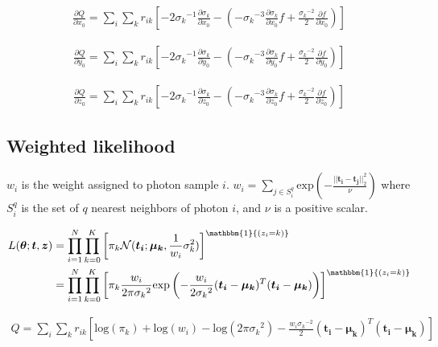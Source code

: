 \documentclass{article}
\begin{document}
\begin{align} \label{eqn:dx_no_weight}
\frac{\partial Q}{\partial x_0} = \sum_i \sum_k r_{ik} \left[ -2{\sigma_k}^{-1}\frac{\partial \sigma_k}{\partial x_0} - \left( -{\sigma_k}^{-3} \frac{\partial \sigma_k}{\partial x_0}f + \frac{{\sigma_k}^{-2}}{2} \frac{\partial f}{\partial x_0}  \right) \right] 
\end{align}

\begin{align} \label{eqn:dy_no_weight}
\frac{\partial Q}{\partial y_0} = \sum_i \sum_k r_{ik} \left[ -2{\sigma_k}^{-1}\frac{\partial \sigma_k}{\partial y_0} - \left( -{\sigma_k}^{-3} \frac{\partial \sigma_k}{\partial y_0}f + \frac{{\sigma_k}^{-2}}{2} \frac{\partial f}{\partial y_0}  \right) \right] 
\end{align}

\begin{align} \label{eqn:dz_no_weight}
\frac{\partial Q}{\partial z_0} = \sum_i \sum_k r_{ik} \left[ -2{\sigma_k}^{-1}\frac{\partial \sigma_k}{\partial z_0} - \left( -{\sigma_k}^{-3} \frac{\partial \sigma_k}{\partial z_0}f + \frac{{\sigma_k}^{-2}}{2} \frac{\partial f}{\partial z_0}  \right) \right] 
\end{align}


\subsection{Weighted likelihood} \label{sec:weighted_like}

$w_i$ is the weight assigned to photon sample $i$.
$w_i = \sum\limits_{j \in S_i^q} \text{exp} \left( -\frac{||\bm{t_i}-\bm{t_j}||_2^2}{\nu} \right)$
where $S_i^q$ is the set of $q$ nearest neighbors of photon $i$, and $\nu$ is a 
positive scalar.

\begin{align}
L(\bm{\theta};\bm{t},\bm{z}) &= \prod_{i=1}^N \prod_{k=0}^K \left[ \pi_k \mathcal{N}(\bm{t_i};\bm{\mu_k},\frac{1}{w_i}\sigma_k^2) \right]^{\mathbbm{1}{(z_i=k)}} \\
&= \prod_{i=1}^N \prod_{k=0}^K \left[ \pi_k \frac{w_i}{2\pi{\sigma_k}^2} \text{exp}\left( -\frac{w_i}{2{\sigma_k}^2} (\bm{t_i}-\bm{\mu_k})^T(\bm{t_i}-\bm{\mu_k}) \right) \right]^{\mathbbm{1}{(z_i=k)}}
\end{align}

\begin{align}
Q = \sum_i \sum_k r_{ik} \left[ \text{log}(\pi_k) + \text{log}(w_i) - \text{log}(2\pi{\sigma_k}^2) - \frac{w_i{\sigma_k}^{-2}}{2}(\bm{t_i}-\bm{\mu_k})^T(\bm{t_i}-\bm{\mu_k}) \right]
\end{align}
\end{document}

